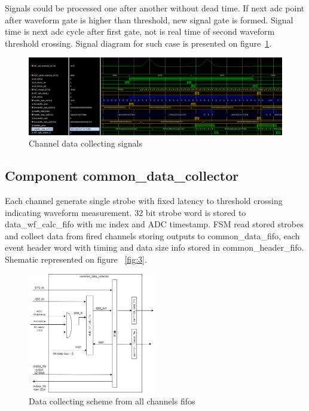 \documentclass{article}
\begin{document}
Signals could be processed one after another without dead time. If next adc point after waveform gate is higher than threshold, new signal gate is formed. Signal time is next adc cycle after first gate, not is real time of second waveform threshold crossing. Signal diagram for such case is presented on figure~\ref{fig:5}.


\begin{figure}[H]
	\centering 
	\includegraphics[width=1.0\textwidth]{ADC_ch_data_collector_wave_pileup.png}
	\caption{\label{fig:5} Channel data collecting signals}
\end{figure}

\subsection{Component common\_data\_collector}
Each channel generate single strobe with fixed latency to threshold crossing indicating waveform measurement. 32 bit strobe word is stored to data\_wf\_calc\_fifo with mc index and ADC timestamp. FSM read stored strobes and collect data from fired channels storing outputs to common\_data\_fifo, each event header word with timing and data size info stored in common\_header\_fifo. Shematic represented on figure ~\ref{fig:3}.

\begin{figure}[H]
	\centering 
	\includegraphics[width=0.5\textwidth]{ADC_common_event_collection.png}
	\caption{\label{fig:6} Data collecting scheme from all channels fifos}
\end{figure}
\end{document}
